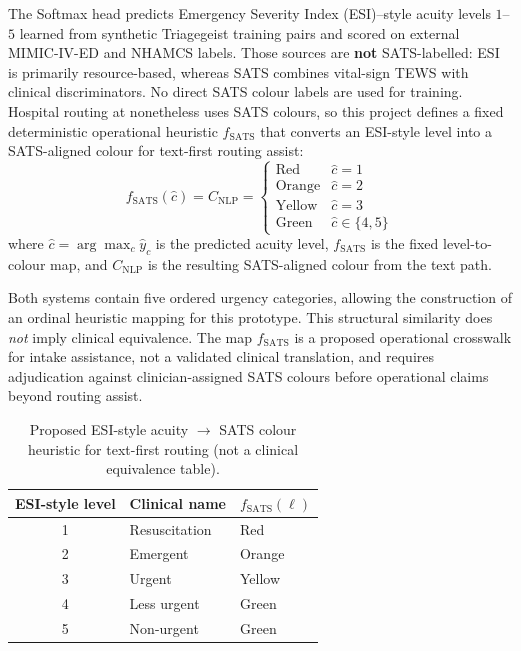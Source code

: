 The Softmax head predicts Emergency Severity Index (ESI)--style acuity levels \(1\)--\(5\) learned from synthetic Triagegeist training pairs and scored on external MIMIC-IV-ED and NHAMCS labels. Those sources are \textbf{not} SATS-labelled: ESI is primarily resource-based, whereas SATS combines vital-sign TEWS with clinical discriminators. No direct SATS colour labels are used for training. Hospital routing at \examplehospital{} nonetheless uses SATS colours, so this project defines a fixed deterministic operational heuristic \(f_{\mathrm{SATS}}\) that converts an ESI-style level into a SATS-aligned colour for text-first routing assist:
\begin{equation}
  f_{\mathrm{SATS}}(\hat{c}) = C_{\mathrm{NLP}} = \begin{cases}
    \text{Red} & \hat{c} = 1 \\
    \text{Orange} & \hat{c} = 2 \\
    \text{Yellow} & \hat{c} = 3 \\
    \text{Green} & \hat{c} \in \{4, 5\}
  \end{cases}
\end{equation}
where \(\hat{c} = \arg\max_c \hat{y}_c\) is the predicted acuity level, \(f_{\mathrm{SATS}}\) is the fixed level-to-colour map, and \(C_{\mathrm{NLP}}\) is the resulting SATS-aligned colour from the text path.

Both systems contain five ordered urgency categories, allowing the construction of an ordinal heuristic mapping for this prototype. This structural similarity does \emph{not} imply clinical equivalence. The map \(f_{\mathrm{SATS}}\) is a proposed operational crosswalk for intake assistance, not a validated clinical translation, and requires adjudication against clinician-assigned SATS colours before operational claims beyond routing assist.

\begin{table}[H]
\centering
\small
\begin{tabular}{|c|l|l|}
\hline
\textbf{ESI-style level} & \textbf{Clinical name} & \(f_{\mathrm{SATS}}(\ell)\) \\
\hline
1 & Resuscitation & Red \\
2 & Emergent & Orange \\
3 & Urgent & Yellow \\
4 & Less urgent & Green \\
5 & Non-urgent & Green \\
\hline
\end{tabular}
\caption{Proposed ESI-style acuity \(\rightarrow\) SATS colour heuristic for text-first routing (not a clinical equivalence table).}
\label{tab:fsats-esi}
\end{table}

